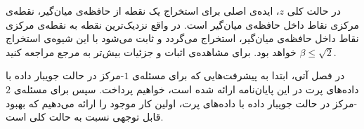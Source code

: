 در حالت کلی $z$، ایده‌ی اصلی برای استخراج یک نقطه از حافظه‌ی میان‌گیر، نقطه‌ی مرکزی نقاط داخل حافظه‌ی میان‌گیر است.
در واقع نزدیک‌ترین نقطه به نقطه‌ی مرکزی نقاط داخل حافظه‌ی میان‌گیر، استخراج می‌گردد و ثابت می‌شود با این شیوه‌ی استخراج $\beta \leq \sqrt{2}$ خواهد بود.
برای مشاهده‌ی اثبات و جزئیات بیش‌تر به مرجع  مراجعه کنید.

در فصل آتی، ابتدا به پیشرفت‌هایی که برای مسئله‌ی $1$-مرکز در حالت جویبار داده با داده‌های پرت در این پایان‌نامه ارائه شده است، خواهیم پرداخت.
سپس برای مسئله‌ی $2$-مرکز در حالت جویبار داده با داده‌های پرت، اولین کار موجود را ارائه می‌دهیم که بهبود قابل توجهی نسبت به حالت کلی است.

